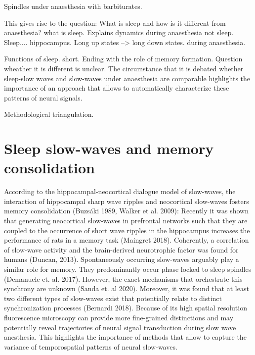 Spindles under anaesthesia with barbiturates.

This gives rise to the question: What is sleep and how is it different from anaesthesia? what is sleep.
Explains dynamics during anaesthesia not sleep. Sleep.... hippocampus.
Long up states --> long down states. during anaesthesia.

Functions of sleep. short. Ending with the role of memory formation. Question wheather it is different is unclear.
The circumstance that it is debated whether sleep-slow waves and slow-waves under anaesthesia are comparable highlights the importance of an approach that allows to automatically characterize these patterns of neural signals.


Methodological triangulation.


\section{Sleep slow-waves and memory consolidation}
\label{slow_waves_and_memory}

According to the hippocampal-neocortical dialogue model of slow-waves, the interaction of hippocampal sharp wave ripples and neocortical slow-waves fosters memory consolidation (Buzsáki 1989, Walker et al. 2009): Recently it was shown that generating neocortical slow-waves in prefrontal networks such that they are coupled to the occurrence of short wave ripples in the hippocampus increases the performance of rats in a memory task (Maingret 2018). Coherently, a correlation of slow-wave activity and the brain-derived neurotrophic factor was found for humans (Duncan, 2013). Spontaneously occurring slow-waves arguably play a similar role for memory. They predominantly occur phase locked to sleep spindles (Demanuele et. al. 2017). However, the exact mechanisms that orchestrate this synchrony are unknown (Sanda et. al 2020). Moreover, it was found that at least two different types of slow-waves exist that potentially relate to distinct synchronization processes (Bernardi 2018). Because of its high spatial resolution fluorescence microscopy can provide more fine-grained distinctions and may potentially reveal trajectories of neural signal transduction during slow wave anesthesia. This highlights the importance of methods that allow to capture the variance of temporospatial patterns of neural slow-waves.


